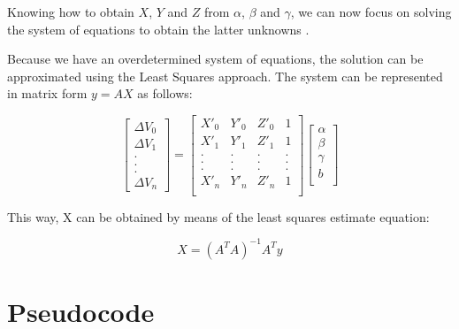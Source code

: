 Knowing how to obtain $X$, $Y$ and $Z$ from $\alpha$, $\beta$ and $\gamma$, we can now focus on solving the system of equations to obtain the latter unknowns .

Because we have an overdetermined system of equations, the solution can be approximated using the Least Squares approach. The system can be represented in matrix form $y = AX$ as follows:

\begin{equation} \label{eq:matrixSystem}
\begin{bmatrix}
\Delta V_{0} \\
\Delta V_{1} \\
. \\
. \\
. \\
\Delta V_{n}
\end{bmatrix}
=
\begin{bmatrix}
X'_{0} & Y'_{0} & Z'_{0} & 1 \\
X'_{1} & Y'_{1} & Z'_{1} & 1 \\
. & . & . & .\\
. & . & . & .\\
. & . & . & .\\
X'_{n} & Y'_{n} & Z'_{n} & 1 \\
\end{bmatrix}
\begin{bmatrix}
\alpha \\
\beta \\
\gamma \\
b \\
\end{bmatrix}
\end{equation}

This way, X can be obtained by means of the least squares estimate equation:

\begin{equation}
	X = (A^{T}A)^{-1}A^{T}y
\end{equation}

\section{Pseudocode}

